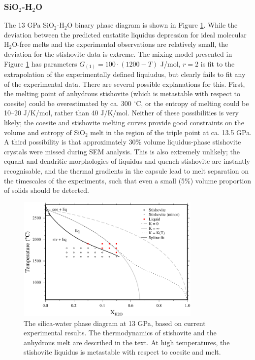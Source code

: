 \documentclass[review]{elsarticle}
\begin{document}
\subsubsection{SiO$_2$-H$_2$O}
The 13 GPa SiO$_2$-H$_2$O binary phase diagram is shown in Figure \ref{fig:SH}. While the deviation between the predicted enstatite liquidus depression for ideal molecular H$_2$O-free melts and the experimental observations are relatively small, the deviation for the stishovite data is extreme. The mixing model presented in Figure \ref{fig:SH} has parameters $G_{(1)} = 100 \cdot (1200-T)$ J/mol, $r=2$ is fit to the extrapolation of the experimentally defined liquiudus, but clearly fails to fit any of the experimental data. There are several possible explanations for this. First, the melting point of anhydrous stishovite (which is metastable with respect to coesite) could be overestimated by ca. 300 $^{\circ}$C, or the entropy of melting could be 10--20 J/K/mol, rather than 40 J/K/mol. Neither of these possibilities is very likely; the coesite and stishovite melting curves provide good constraints on the volume and entropy of SiO$_2$ melt in the region of the triple point at ca. 13.5 GPa. A third possibility is that approximately 30\% volume liquidus-phase stishovite crystals were missed during SEM analysis. This is also extremely unlikely; the equant and dendritic morphologies of liquidus and quench stishovite are instantly recognisable, and the thermal gradients in the capsule lead to melt separation on the timescales of the experiments, such that even a small (5\%) volume proportion of solids should be detected.

\begin{figure}[ht!]
  \centering
      \includegraphics[width=0.8\textwidth]{figures/stishovite}
      \caption{The silica-water phase diagram at 13 GPa, based on current experimental results. The thermodynamics of stishovite and the anhydrous melt are described in the text. At high temperatures, the stishovite liquidus is metastable with respect to coesite and melt.}
  \label{fig:SH}
\end{figure}
\end{document}
